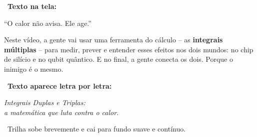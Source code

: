 \begin{tela}
\faDesktop\ \textbf{Texto na tela:}
\begin{center}
``O calor não avisa. Ele age.''
\end{center}
\end{tela}


\begin{fala}
Neste vídeo, a gente vai usar uma ferramenta do cálculo -- as
\textbf{integrais múltiplas} -- para medir, prever e entender esses efeitos
nos dois mundos: no chip de silício e no qubit quântico.
E no final, a gente conecta os dois. Porque o inimigo é o mesmo.
\end{fala}

\begin{tela}
\faDesktop\ \textbf{Texto aparece letra por letra:}
\begin{center}
\large\itshape Integrais Duplas e Triplas:\\
a matemática que luta contra o calor.
\end{center}
\end{tela}

\begin{audiocue}
\faMusic\ Trilha sobe brevemente e cai para fundo suave e contínuo.
\end{audiocue}